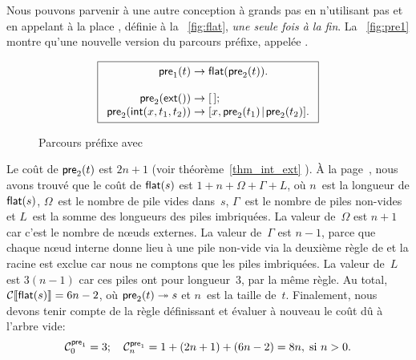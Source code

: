 Nous pouvons parvenir à une autre conception à grands
pas en n'utilisant pas
 et en appelant à la place
, définie
à la \fig~\vref{fig:flat}, \emph{une seule fois à la fin}. La
\fig~\vref{fig:pre1} montre qu'une nouvelle version du parcours
préfixe, appelée .
\begin{figure}[b]
\begin{equation*}
\boxed{
\begin{array}{r@{\;}c@{\;}l}
\fun{pre}_1(t) & \rightarrow & \fun{flat}(\fun{pre}_2(t)).\\
\\
\fun{pre}_2(\fun{ext}()) & \rightarrow & \el;\\
\fun{pre}_2(\fun{int}(x,t_1,t_2)) & \rightarrow &
  \cons{x,\fun{pre}_2(t_1)}{\fun{pre}_2(t_2)}.
\end{array}}
\end{equation*}
\caption{Parcours préfixe avec \label{fig:pre1}}
\end{figure}
Le coût de \(\textsf{pre}_2(t)\) est
\(2n+1\) (voir théorème~\ref{thm_int_ext} ). À
la page~\pageref{cost_flat}, nous avons trouvé que le coût de
\(\textsf{flat}(s)\) est \(1 + n + \Omega +
\Gamma + L\), où \(n\)~est la longueur de
\(\textsf{flat}(s)\), \(\Omega\)~est le nombre
de pile vides dans~\(s\), \(\Gamma\)~est le nombre de piles non-vides
et \(L\)~est la somme des longueurs des piles imbriquées. La valeur
de~\(\Omega\) est \(n+1\) car c'est le nombre de n{\oe}uds
externes. La valeur de~\(\Gamma\) est \(n-1\), parce que chaque
n{\oe}ud interne donne lieu à une pile non-vide via la deuxième règle
de  et la racine est
exclue car nous ne comptons que les piles imbriquées. La valeur
de~\(L\) est \(3(n-1)\) car ces piles ont pour longueur~\(3\), par la
même règle. Au total, \(\mathcal{C}\llbracket{\textsf{flat}(s)}\rrbracket = 6n - 2\), où
\(\textsf{pre}_2(t) \twoheadrightarrow s\) et \(n\)~est la taille
de~\(t\). Finalement, nous devons tenir compte de la règle définissant
 et évaluer à nouveau
le coût dû à l'arbre vide:
\begin{equation*}
\C{\fun{pre}_1}{0} = 3;\index{pre1@$\C{\fun{pre}_1}{n}$}
\quad
\C{\fun{pre}_1}{n} = 1 + (2n+1) + (6n - 2) = 8n,\;
\text{si \(n > 0\).}
\end{equation*}

